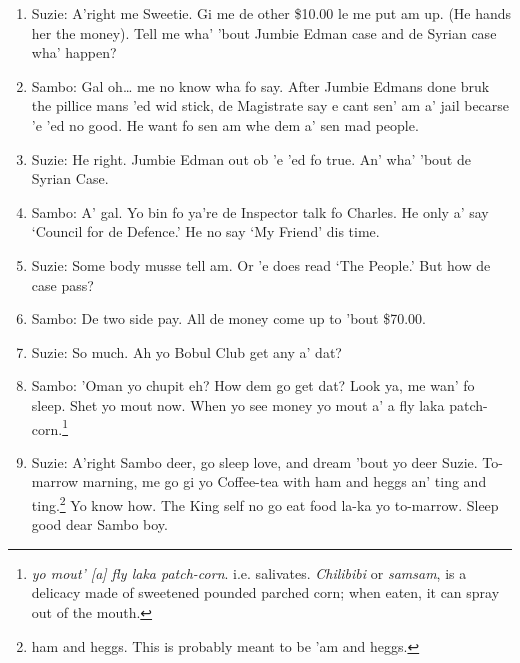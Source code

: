 \documentclass[output=paper,colorlinks,citecolor=brown]{langscibook}
\begin{document}
\begin{enumerate}[nosep]
    \item  Suzie:	A’right me Sweetie. Gi me de other \$10.00 le me put am up. (He hands her the money). Tell me wha’ ’bout Jumbie Edman case and de Syrian case wha’ happen?
    \item  Sambo:  Gal oh… me no know wha fo say. After Jumbie Edmans done bruk the pillice mans ’ed wid stick, de Magistrate say e cant sen’ am a’ jail becarse ’e ’ed no good. He want fo sen am whe dem a’ sen mad people.
    \item  Suzie:	He right. Jumbie Edman out ob ’e ’ed fo true. An’ wha’ ’bout de Syrian Case.
    \item  Sambo:  A’ gal. Yo bin fo ya’re de Inspector talk fo Charles. He only a’ say ‘Council for de Defence.’ He no say ‘My Friend’ dis time.
    \item  Suzie:	Some body musse tell am. Or ’e does read ‘The People.’ But how de case pass?
    \item  Sambo:  De two side pay. All de money come up to ’bout \$70.00.
    \item  Suzie:	So much. Ah yo Bobul Club get any a’ dat?
    \item  Sambo:  ’Oman yo chupit eh? How dem go get dat? Look ya, me wan’ fo sleep. Shet yo mout now. When yo see money yo mout a’ a fly laka patch-corn.\footnote{\textit{yo mout’ [a] fly laka patch-corn}. i.e. salivates. \textit{Chilibibi} or \textit{samsam}, is a delicacy made
of sweetened pounded parched corn; when eaten, it can spray out of the mouth.}
    \item  Suzie:	A’right Sambo deer, go sleep love, and dream ’bout yo deer Suzie. To-marrow marning, me go gi yo Coffee-tea with ham and heggs an’ ting and ting.\footnote{ham and heggs. This is probably meant to be ’am and heggs.} Yo know how. The King self no go eat food la-ka yo to-marrow. Sleep good dear Sambo boy.
\end{enumerate}
\end{document}
